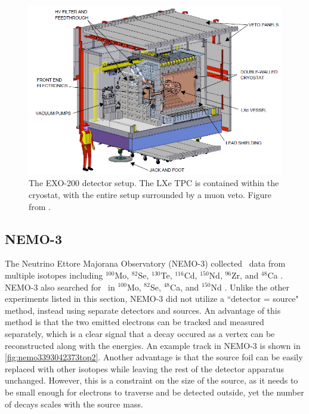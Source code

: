 \begin{figure}[htbp]
    \centering
    \includegraphics[width=0.7\linewidth]{Figures/EXO.png}
    \caption[The EXO-200 detector setup.]{The EXO-200 detector setup. The LXe TPC is contained within the cryostat, with the entire setup surrounded by a muon veto. Figure from \cite{Auger:2012gs}.}
    \label{fig:EXO}
\end{figure}

\subsection{NEMO-3}
The Neutrino Ettore Majorana Observatory (NEMO-3) collected \twonubb~data from multiple isotopes including $^{100}$Mo, $^{82}$Se, $^{130}$Te, $^{116}$Cd, $^{150}$Nd, $^{96}$Zr, and $^{48}$Ca \cite{Bongrand:2011ei}. NEMO-3 also searched for \zeronubb~in $^{100}$Mo, $^{82}$Se, $^{48}$Ca, and $^{150}$Nd \cite{Bongrand:2011ei}\cite{::2016dpe}\cite{Arnold:2016ezh}. Unlike the other experiments listed in this section, NEMO-3 did not utilize a ``detector = source" method, instead using separate detectors and sources. An advantage of this method is that the two emitted electrons can be tracked and measured separately, which is a clear signal that a decay occured as a vertex can be reconstructed along with the energies. An example track in NEMO-3 is shown in \autoref{fig:nemo3393042373top2}. Another advantage is that the source foil can be easily replaced with other isotopes while leaving the rest of the detector apparatus unchanged. However, this is a constraint on the size of the source, as it needs to be small enough for electrons to traverse and be detected outside, yet the number of decays scales with the source mass.

